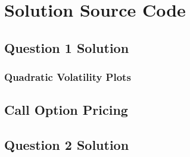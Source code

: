 \documentclass[10pt]{article}
\newcommand*\lstinputpath[1]{\lstset{inputpath=#1}} %
\begin{document}
\clearpage

\lstinputpath{}

\newpage
\section{Solution Source Code} \label{appendix:source}
    \subsection{Question 1 Solution} \label{appendix:source:q1}
		\subsubsection{Quadratic Volatility Plots}
			

		\subsection{Call Option Pricing}
			

    \subsection{Question 2 Solution} \label{appendix:source:q2}
		

\newpage

\nocite{Shreve2004}
\nocite{Stefanica2011}
\nocite{Weerawarana2016}
\nocite{Florescu2019}
\nocite{Carr}

\printbibliography

\end{document}
